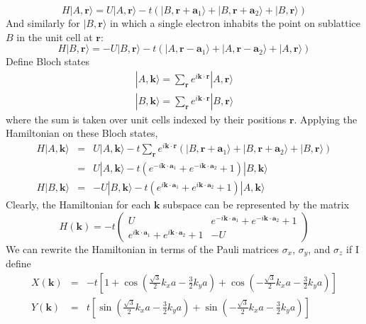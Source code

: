 \documentclass[a4paper,12pt]{article}
\renewcommand{\vec}[1]{\boldsymbol{\mathbf{#1}}}
\begin{document}
\begin{equation}
H|A,\vec{r} \rangle = U|A,\vec{r} \rangle -t \left( |B,\vec{r}+\vec{a}_1 \rangle + |B,\vec{r}+\vec{a}_2 \rangle + |B,\vec{r} \rangle \right)
\end{equation}
And similarly for $|B,\vec{r} \rangle$ in which a single electron inhabits the point on sublattice $B$ in the unit cell at $\vec{r}$:
\begin{equation}
H|B,\vec{r} \rangle = -U|B,\vec{r} \rangle -t \left( |A,\vec{r}-\vec{a}_1 \rangle + |A,\vec{r}-\vec{a}_2 \rangle + |A,\vec{r} \rangle \right)
\end{equation}
Define Bloch states
\begin{eqnarray}
|A, \vec{k} \rangle = \sum_{\vec{r}} e^{i \vec{k} \cdot \vec{r}} |A,\vec{r} \rangle \\
|B, \vec{k} \rangle = \sum_{\vec{r}} e^{i \vec{k} \cdot \vec{r}} |B,\vec{r} \rangle
\end{eqnarray}
where the sum is taken over unit cells indexed by their positions $\vec{r}$.  Applying the Hamiltonian on these Bloch states,
\begin{eqnarray}
H|A,\vec{k} \rangle &=& U|A,\vec{k} \rangle -t \sum_{\vec{r}}  e^{i \vec{k} \cdot \vec{r}} \left( |B,\vec{r}+\vec{a}_1 \rangle + |B,\vec{r}+\vec{a}_2 \rangle + |B,\vec{r} \rangle \right) \nonumber \\
 &=& U|A,\vec{k} \rangle -t \left( e^{-i \vec{k} \cdot \vec{a}_1}+e^{-i \vec{k} \cdot \vec{a}_2} +1 \right)|B, \vec{k} \rangle \\
H|B,\vec{k} \rangle &=& -U|B,\vec{k} \rangle - t \left( e^{i \vec{k} \cdot \vec{a}_1}+e^{i \vec{k} \cdot \vec{a}_2} +1 \right)|A, \vec{k} \rangle
\end{eqnarray}
Clearly, the Hamiltonian for each $\vec{k}$ subspace can be represented by the matrix
\begin{equation}
H(\vec{k})= -t \left(
\begin{array}{cc}
U & e^{-i \vec{k} \cdot \vec{a}_1}+e^{-i \vec{k} \cdot \vec{a}_2} +1  \\
e^{i \vec{k} \cdot \vec{a}_1}+e^{i \vec{k} \cdot \vec{a}_2} +1 & -U
\end{array}
\right)
\end{equation}
We can rewrite the Hamiltonian in terms of the Pauli matrices $\sigma_x$, $\sigma_y$, and $\sigma_z$ if I define
\begin{eqnarray}
X(\vec{k}) &=& -t \left[ 1+ \cos \left( \frac{\sqrt{3}}{2}k_x a - \frac{3}{2}k_y a \right) + \cos \left( -\frac{\sqrt{3}}{2}k_x a - \frac{3}{2}k_y a \right) \right] \\
Y(\vec{k}) &=& t \left[ \sin \left( \frac{\sqrt{3}}{2}k_x a - \frac{3}{2}k_y a \right) + \sin \left( -\frac{\sqrt{3}}{2}k_x a - \frac{3}{2}k_y a \right) \right]
\end{eqnarray}
\end{document}
